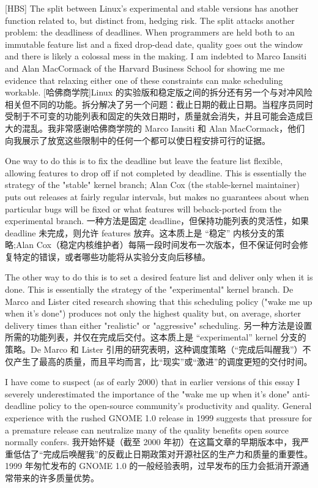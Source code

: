 \documentclass[a4paper,12pt,UTF8,twoside]{ctexbook}
\begin{document}
[HBS] The split between Linux's experimental and stable versions has another function related to, but distinct from, hedging risk. The split attacks another problem: the deadliness of deadlines. When programmers are held both to an immutable feature list and a fixed drop-dead date, quality goes out the window and there is likely a colossal mess in the making. I am indebted to Marco Iansiti and Alan MacCormack of the Harvard Business School for showing me me evidence that relaxing either one of these constraints can make scheduling workable.
[哈佛商学院]Linux 的实验版和稳定版之间的拆分还有另一个与对冲风险相关但不同的功能。拆分解决了另一个问题：截止日期的截止日期。当程序员同时受制于不可变的功能列表和固定的失效日期时，质量就会消失，并且可能会造成巨大的混乱。我非常感谢哈佛商学院的 Marco Iansiti 和 Alan MacCormack，他们向我展示了放宽这些限制中的任何一个都可以使日程安排可行的证据。

One way to do this is to fix the deadline but leave the feature list flexible, allowing features to drop off if not completed by deadline. This is essentially the strategy of the "stable" kernel branch; Alan Cox (the stable-kernel maintainer) puts out releases at fairly regular intervals, but makes no guarantees about when particular bugs will be fixed or what features will beback-ported from the experimental branch.
一种方法是固定 deadline，但保持功能列表的灵活性，如果 deadline 未完成，则允许 features 放弃。这本质上是 “稳定” 内核分支的策略;Alan Cox（稳定内核维护者）每隔一段时间发布一次版本，但不保证何时会修复特定的错误，或者哪些功能将从实验分支向后移植。

The other way to do this is to set a desired feature list and deliver only when it is done. This is essentially the strategy of the "experimental" kernel branch. De Marco and Lister cited research showing that this scheduling policy ("wake me up when it's done") produces not only the highest quality but, on average, shorter delivery times than either "realistic" or "aggressive" scheduling.
另一种方法是设置所需的功能列表，并仅在完成后交付。这本质上是 “experimental” kernel 分支的策略。De Marco 和 Lister 引用的研究表明，这种调度策略（“完成后叫醒我”）不仅产生了最高的质量，而且平均而言，比“现实”或“激进”的调度更短的交付时间。

I have come to suspect (as of early 2000) that in earlier versions of this essay I severely underestimated the importance of the "wake me up when it's done" anti-deadline policy to the open-source community's productivity and quality. General experience with the rushed GNOME 1.0 release in 1999 suggests that pressure for a premature release can neutralize many of the quality benefits open source normally confers.
我开始怀疑（截至 2000 年初）在这篇文章的早期版本中，我严重低估了“完成后唤醒我”的反截止日期政策对开源社区的生产力和质量的重要性。1999 年匆忙发布的 GNOME 1.0 的一般经验表明，过早发布的压力会抵消开源通常带来的许多质量优势。
\end{document}
